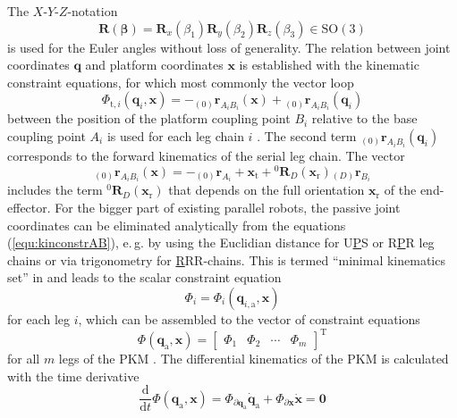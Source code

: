 \documentclass[robotics,article,submit,moreauthors,pdftex]{Definitions/mdpi}
\newcommand{\bm}[1]{\boldsymbol{#1}}
\newcommand{\ortvek}[4]{{ }_{(#1)}{\boldsymbol{#2}}^{#3}_{#4} }
\newcommand{\rotmat}[2]{{{ }^{#1}\boldsymbol{R}}_{#2}}
\newcommand{\transp}[0]{{\mathrm{T}}}
\let\Phi\varPhi
\begin{document}
The $X$-$Y$-$Z$-notation
%
\begin{equation}
\bm{R}(\bm{\beta}) = \bm{R}_x(\beta_1) \bm{R}_y(\beta_2) \bm{R}_z(\beta_3) \in \mathrm{SO(3)}
\label{equ:def_rmat_xyz}
\end{equation}
%
is used for the Euler angles without loss of generality.
%
The relation between joint coordinates $\bm{q}$ and platform coordinates $\bm{x}$ is established with the kinematic constraint equations, for which most commonly the vector loop
%
\begin{equation}
\bm{\Phi}_{\mathrm{t},i}(\bm{q}_i,\bm{x}) = - \ortvek{0}{r}{}{A_iB_i}(\bm{x}) + \ortvek{0}{r}{}{A_iB_i}(\bm{q}_i) 
\label{equ:kinconstrAB}
\end{equation}
%
between the position of the platform coupling point $B_i$ relative to the base coupling point $A_i$ is used for each leg chain $i$ \cite{Merlet2006}.
The second term $\ortvek{0}{r}{}{A_iB_i}(\bm{q}_i)$ corresponds to the forward kinematics of the serial leg chain. 
The vector
\begin{equation}
\ortvek{0}{r}{}{A_iB_i}(\bm{x}) = 
- \ortvek{0}{r}{}{A_i}
+ \bm{x}_{\mathrm{t}} + \rotmat{0}{D}(\bm{x}_{\mathrm{r}}) \ortvek{D}{r}{}{B_i}
\label{equ:vec_AB}
\end{equation}
%
includes the term $\rotmat{0}{D}(\bm{x}_{\mathrm{r}})$ that depends on the full orientation $\bm{x}_{\mathrm{r}}$ of the end-effector.
%
For the bigger part of existing parallel robots, the passive joint coordinates can be eliminated analytically from the equations (\ref{equ:kinconstrAB}), e.\,g. by using the Euclidian distance for U\underline{P}S or R\underline{P}R leg chains or via trigonometry for \underline{R}RR-chains.
This is termed ``minimal kinematics set'' in \cite{Merlet2006} and leads to the scalar constraint equation
%
\begin{equation}
\Phi_{i}
=
\Phi_{i}(\bm{q}_{i,\mathrm{a}},\bm{x})
\end{equation}
%
for each leg $i$, which can be assembled to the vector of constraint equations
%
\begin{equation}
\bm{\Phi}(\bm{q}_{\mathrm{a}},\bm{x})
=
\begin{bmatrix}
\Phi_1 & \Phi_2 & \cdots & \Phi_m
\end{bmatrix}^\transp
\label{equ:constr_qa}
\end{equation}
%
for all $m$ legs of the PKM .
The differential kinematics of the PKM is calculated with the time derivative
%
\begin{equation}
\frac{\mathrm{d}}{{\mathrm{d}}t} \bm{\Phi}(\bm{q}_\mathrm{a},\bm{x})
=
\bm{\Phi}_{\partial \bm{q}_\mathrm{a}} \dot{\bm{q}}_\mathrm{a}
+
\bm{\Phi}_{\partial \bm{x}} \dot{\bm{x}}
=
\bm{0}
\label{equ:constr_qa_diff}
\end{equation}
\end{document}
